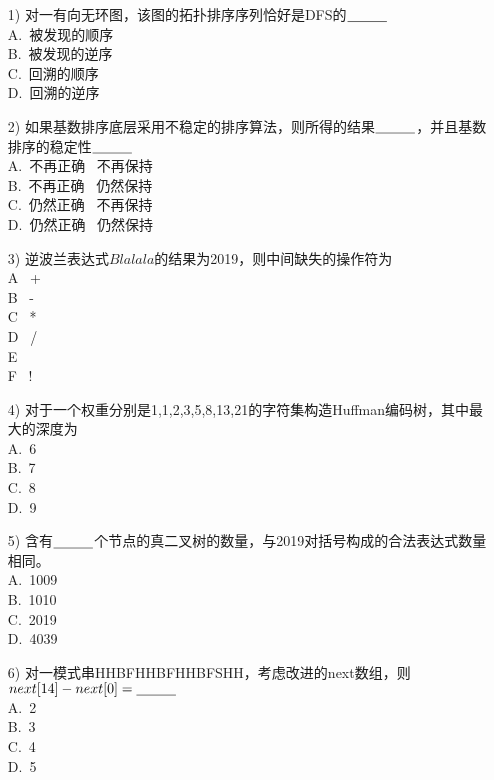 \documentclass[UTF8,12pt]{ctexart}
\begin{document}
		\begin{itemize}

			\item[1)]对一有向无环图，该图的拓扑排序序列恰好是DFS的$\underline{\hbox to 10mm{}}$\\
			A.\ 被发现的顺序\\
			B.\ 被发现的逆序\\
			C.\ 回溯的顺序\\
			D.\ 回溯的逆序

			\item[2)]如果基数排序底层采用不稳定的排序算法，则所得的结果$\underline{\hbox to 10mm{}}$，并且基数排序的稳定性$\underline{\hbox to 10mm{}}$\\
			A.\ 不再正确 \ 不再保持\\
			B.\ 不再正确 \ 仍然保持\\
			C.\ 仍然正确 \ 不再保持\\
			D.\ 仍然正确 \ 仍然保持

			\item[3)]逆波兰表达式$Blalala$的结果为2019，则中间缺失的操作符为\\
			A \ + \\
			B \ - \\
			C \ * \\
			D \ / \\
			E \ \^ \\
			F \ !

			\item[4)]对于一个权重分别是1,1,2,3,5,8,13,21的字符集构造Huffman编码树，其中最大的深度为\\
			A.\ 6\\
			B.\ 7\\
			C.\ 8\\
			D.\ 9

			\item[5)]含有$\underline{\hbox to 10mm{}}$个节点的真二叉树的数量，与2019对括号构成的合法表达式数量相同。\\
			A.\ 1009\\
			B.\ 1010\\
			C.\ 2019\\
			D.\ 4039

			\item[6)]对一模式串HHBFHHBFHHBFSHH，考虑改进的next数组，则$next[14] - next[0] = \underline{\hbox to 10mm{}}$\\
			A.\ 2\\
			B.\ 3\\
			C.\ 4\\
			D.\ 5

		\end{itemize}
\end{document}
